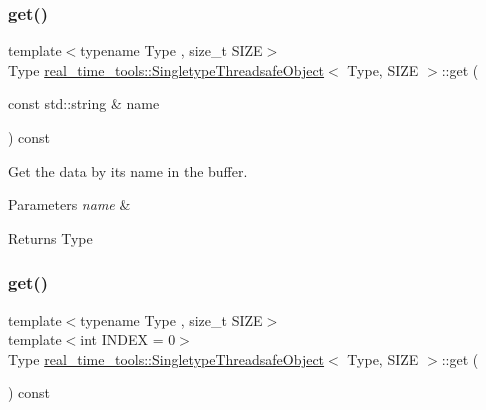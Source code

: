 \subsubsection{\texorpdfstring{get()}{get()}\hspace{0.1cm}{\footnotesize\ttfamily [2/3]}}
{\footnotesize\ttfamily template$<$typename Type , size\+\_\+t S\+I\+ZE$>$ \\
Type \hyperlink{classreal__time__tools_1_1SingletypeThreadsafeObject}{real\+\_\+time\+\_\+tools\+::\+Singletype\+Threadsafe\+Object}$<$ Type, S\+I\+ZE $>$\+::get (\begin{DoxyParamCaption}\item[{const std\+::string \&}]{name }\end{DoxyParamCaption}) const\hspace{0.3cm}{\ttfamily [inline]}}



Get the data by its name in the buffer. 


\begin{DoxyParams}{Parameters}
{\em name} & \\
\hline
\end{DoxyParams}
\begin{DoxyReturn}{Returns}
Type 
\end{DoxyReturn}
\mbox{\label{classreal__time__tools_1_1SingletypeThreadsafeObject_a7c56d14b8e1526cf6f16bce644f09849}} 
\subsubsection{\texorpdfstring{get()}{get()}\hspace{0.1cm}{\footnotesize\ttfamily [3/3]}}
{\footnotesize\ttfamily template$<$typename Type , size\+\_\+t S\+I\+ZE$>$ \\
template$<$int I\+N\+D\+EX = 0$>$ \\
Type \hyperlink{classreal__time__tools_1_1SingletypeThreadsafeObject}{real\+\_\+time\+\_\+tools\+::\+Singletype\+Threadsafe\+Object}$<$ Type, S\+I\+ZE $>$\+::get (\begin{DoxyParamCaption}{ }\end{DoxyParamCaption}) const\hspace{0.3cm}{\ttfamily [inline]}}



